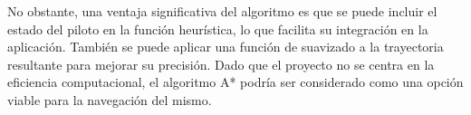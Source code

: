 \documentclass[a4paper,11pt]{book}
\begin{document}
\begin{itemize}


   No obstante, una ventaja significativa del algoritmo es que se puede incluir el estado del piloto en la función heurística, lo que facilita su integración en la aplicación. También se puede aplicar una función de suavizado a la trayectoria resultante para mejorar su precisión. Dado que el proyecto no se centra en la eficiencia computacional, el algoritmo A* podría ser considerado como una opción viable para la navegación del mismo.


\end{itemize}
%
%
%
%
%
%
%
%
%
%
%
%
%
%
%
%
%
%
% 

%
%
%
\chapter*{}
\thispagestyle{empty}
\end{document}
